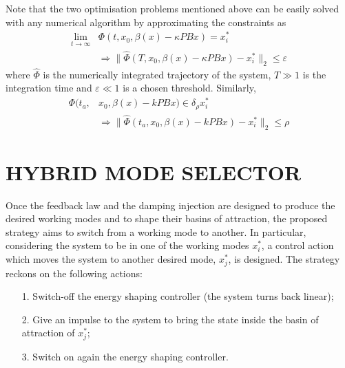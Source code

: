 {Note that the two optimisation problems mentioned above can be easily solved with any numerical algorithm by approximating the constraints as
\begin{align*}
    \lim\limits_{t\rightarrow\infty}&\Phi(t,x_0,\beta(x)-\kappa PBx)=x^*_i\\    
    &\Rightarrow \|\hat{\Phi}(T,x_0,\beta(x)-\kappa PBx)-x^*_i\|_2\leq\varepsilon
\end{align*}
%
where $\hat{\Phi}$ is the numerically integrated trajectory of the system, $T\gg 1$ is the integration time and $\varepsilon \ll 1$ is a chosen threshold.
Similarly,
\begin{align*}
    \Phi(t_a,&x_0,\beta(x)-kPBx)\in\delta_\rho x_i^*\\    
    &\Rightarrow \|\hat{\Phi}(t_a,x_0,\beta(x)-kPBx)-x^*_i\|_2\leq\rho
\end{align*}
}
\fi
%
%
\section{HYBRID MODE SELECTOR}
Once the feedback law and the damping injection are designed to produce the desired working modes and to shape their basins of attraction, the proposed strategy aims to switch from a working mode to another.
In particular, considering the system to be in one of the working modes $x_i^*$, a control action which moves the system to another desired mode, $x_j^*$, is designed.
The strategy reckons on the following actions:
\begin{itemize}
    \item [1.] Switch-off the energy shaping controller (the system turns back linear);
    \item [2.] Give an impulse to the system to bring the state inside the basin of attraction of $x_j^*$;
    \item [3.] Switch on again the energy shaping controller.
\end{itemize}
%

